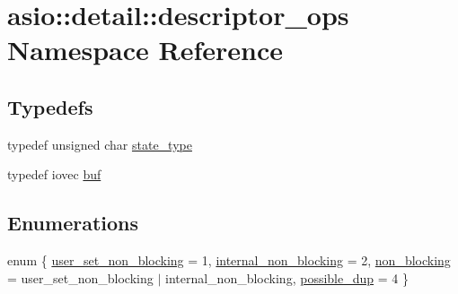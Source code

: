 \hypertarget{namespaceasio_1_1detail_1_1descriptor__ops}{}\section{asio\+:\+:detail\+:\+:descriptor\+\_\+ops Namespace Reference}
\label{namespaceasio_1_1detail_1_1descriptor__ops}
\subsection*{Typedefs}
\begin{DoxyCompactItemize}
\item 
typedef unsigned char \hyperlink{namespaceasio_1_1detail_1_1descriptor__ops_a773b997617ef697b51ff3f91f6e48764}{state\+\_\+type}
\item 
typedef iovec \hyperlink{namespaceasio_1_1detail_1_1descriptor__ops_ad10e658a754ff775cdcc3b3decd3c8c9}{buf}
\end{DoxyCompactItemize}
\subsection*{Enumerations}
\begin{DoxyCompactItemize}
\item 
enum \{ \hyperlink{namespaceasio_1_1detail_1_1descriptor__ops_abc164de9d9f17c5082e27e043bd4bb3dabc2ae064c1ea10a1c92b27ad21098a6d}{user\+\_\+set\+\_\+non\+\_\+blocking} = 1, 
\hyperlink{namespaceasio_1_1detail_1_1descriptor__ops_abc164de9d9f17c5082e27e043bd4bb3dae851554ee970db7e3e2aa8d5e257d78b}{internal\+\_\+non\+\_\+blocking} = 2, 
\hyperlink{namespaceasio_1_1detail_1_1descriptor__ops_abc164de9d9f17c5082e27e043bd4bb3da9694dc69c579805472d9c180aa66cd15}{non\+\_\+blocking} = user\+\_\+set\+\_\+non\+\_\+blocking $\vert$ internal\+\_\+non\+\_\+blocking, 
\hyperlink{namespaceasio_1_1detail_1_1descriptor__ops_abc164de9d9f17c5082e27e043bd4bb3daf5a58248660cca977665f283da5ed7a1}{possible\+\_\+dup} = 4
 \}
\end{DoxyCompactItemize}
